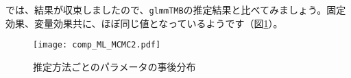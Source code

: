 では、結果が収束しましたので、\verb|glmmTMB|の推定結果と比べてみましょう。固定効果、変量効果共に、ほぼ同じ値となっているようです（図\ref{comp_ML_MCMC2}）。
\begin{figure}[htb]
\begin{center}
\graphicspath{{3_glm/figs/}}
\texttt{[image: comp\_ML\_MCMC2.pdf]}\\
\caption{推定方法ごとのパラメータの事後分布}
\label{comp_ML_MCMC2}
\end{center}
\end{figure}
